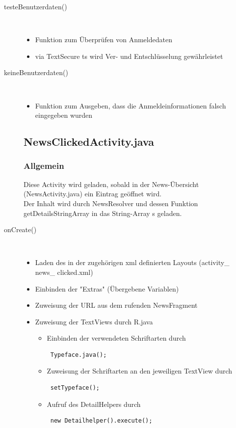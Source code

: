 \begin{description}
\item[testeBenutzerdaten()]~\par
\begin{itemize}
\item Funktion zum Überprüfen von Anmeldedaten
\item via TextSecure ts wird Ver- und Entschlüsselung gewährleistet
\end{itemize}


 
\item[keineBenutzerdaten()]~\par
\begin{itemize}
\item Funktion zum Ausgeben, dass die Anmeldeinformationen falsch eingegeben wurden
\end{itemize}

\subsection{NewsClickedActivity.java}
\lstset{language=JAVA}
\subsubsection{Allgemein}
Diese Activity wird geladen, sobald in der News-Übersicht (NewsActivity.java) ein Eintrag geöffnet wird. \\
Der Inhalt wird durch NewsResolver und dessen Funktion getDetailsStringArray in das String-Array s geladen.
\item[onCreate()]~\par
\begin{itemize}
\item Laden des in der zugehörigen xml definierten Layouts (activity\_ news\_ clicked.xml)
\item Einbinden der "Extras" (Übergebene Variablen)
\item Zuweisung der URL aus dem rufenden NewsFragment
\item Zuweisung der TextViews durch R.java
\begin{itemize}
\item Einbinden der verwendeten Schriftarten durch 
\begin{lstlisting}
 Typeface.java();
\end{lstlisting}
\item Zuweisung der Schriftarten an den jeweiligen TextView durch
\begin{lstlisting}
 setTypeface();
\end{lstlisting}
\item Aufruf des DetailHelpers durch 
\begin{lstlisting}
 new Detailhelper().execute();
\end{lstlisting}
\end{itemize}
\end{itemize}


\end{description}
